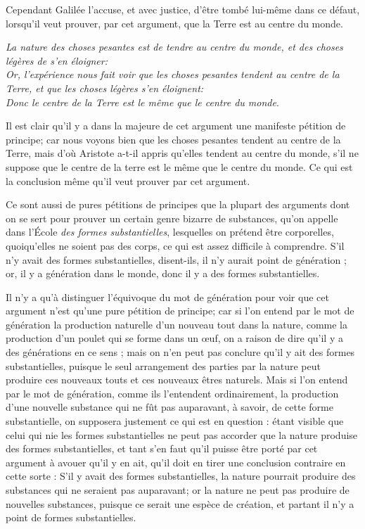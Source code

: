 Cependant Galilée l'accuse, et avec justice, d'être tombé lui-même dans ce défaut, lorsqu'il veut prouver, par cet argument, que la Terre est au centre du monde.

\emph{La nature des choses pesantes est de tendre au centre du monde, et des choses légères de s'en éloigner:
\\Or, l'expérience nous fait voir que les choses pesantes tendent au centre de la Terre, et que les choses légères s'en éloignent:
\\Donc le centre de la Terre est le même que le centre du monde}.

Il est clair qu'il y a dans la majeure de cet argument une manifeste pétition de principe; car nous voyons bien que les choses pesantes tendent au centre de la Terre, mais d'où Aristote a-t-il appris qu'elles tendent au centre du monde, s'il ne suppose que le centre de la terre est le même que le centre du monde. Ce qui est la conclusion même qu'il veut prouver par cet argument.

Ce sont aussi de pures pétitions de principes que la plupart des arguments dont on se sert pour prouver un certain genre bizarre de substances, qu'on appelle dans l'École \emph{des formes substantielles}, lesquelles on prétend être corporelles, quoiqu'elles ne soient pas des corps, ce qui est assez difficile à comprendre. S'il n'y avait des formes substantielles, disent-ils, il n'y aurait point de génération ; or, il y a génération dans le monde, donc il y a des formes substantielles.

Il n'y a qu'à distinguer l'équivoque du mot de génération pour voir que cet argument n'est qu'une pure pétition de principe; car si l'on entend par le mot de génération la production naturelle d'un nouveau tout dans la nature, comme la production d'un poulet qui se forme dans un œuf, on a raison de dire qu'il y a des générations en ce sens ; mais on n'en peut pas conclure qu'il y ait des formes substantielles, puisque le seul arrangement des parties par la nature peut produire ces nouveaux touts et ces nouveaux êtres naturels. Mais si l'on entend par le mot de génération, comme ils l'entendent ordinairement, la production d'une nouvelle substance qui ne fût pas auparavant, à savoir, de cette forme substantielle, on supposera justement ce qui est en question : étant visible que celui qui nie les formes substantielles ne peut pas accorder que la nature produise des formes substantielles, et tant s'en faut qu'il puisse être porté par cet argument à avouer qu'il y en ait, qu'il doit en tirer une conclusion contraire en cette sorte : S'il y avait des formes substantielles, la nature pourrait produire des substances qui ne seraient pas auparavant; or la nature ne peut pas produire de nouvelles substances, puisque ce serait une espèce de création, et partant il n'y a point de formes substantielles.

